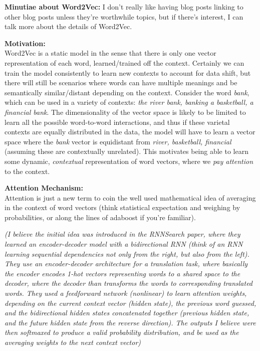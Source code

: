 \documentclass[11pt]{article}
\begin{document}
\textbf{Minutiae about Word2Vec:} 
I don't really like having blog posts linking to other blog posts unless they're worthwhile topics, but if there's interest, I can talk more about the details of Word2Vec.

\textbf{Motivation:}\\

Word2Vec is a static model in the sense that there is only one vector representation of each word, learned/trained off the context. Certainly we can train the model consistently to learn new contexts to account for data shift, but there will still be scenarios where words can have multiple meanings and be semantically similar/distant depending on the context. Consider the word \textit{bank}, which can be used in a variety of contexts: \textit{the river bank, banking a basketball, a financial bank}. The dimensionality of the vector space is likely to be limited to learn all the possible word-to-word interactions, and thus if these varietal contexts are equally distributed in the data, the model will have to learn a vector space where the \textit{bank} vector is equidistant from \textit{river, basketball, financial} (assuming these are contextually unrelated). This motivates being able to learn some dynamic, \textit{contextual} representation of word vectors, where we \textit{pay attention} to the context.

\textbf{Attention Mechanism:}\\

Attention is just a new term to coin the well used mathematical idea of averaging in the context of word vectors (think statistical expectation and weighing by probabilities, or along the lines of adaboost if you're familiar). 

\textit{(I believe the initial idea was introduced in the RNNSearch paper, where they learned an encoder-decoder model with a bidirectional RNN (think of an RNN learning sequential dependencies not only from the right, but also from the left). They use an encoder-decoder architecture for a translation task, where basically the encoder encodes 1-hot vectors representing words to a shared space to the decoder, where the decoder than transforms the words to corresponding translated words. They used a feedforward network (nonlinear) to learn attention weights, depending on the current context vector (hidden state), the previous word guessed, and the bidirectional hidden states concatenated together (previous hidden state, and the future hidden state from the reverse direction). The outputs I believe were then softmaxed to produce a valid probability distribution, and be used as the averaging weights to the next context vector)}
\end{document}
